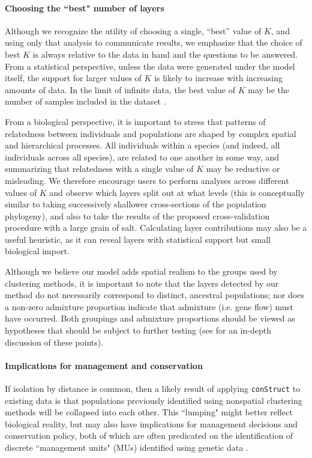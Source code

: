 \documentclass[10pt,letterpaper]{article}
\begin{document}
\paragraph{Choosing the ``best" number of layers}
Although we recognize the utility of choosing a single, ``best'' value of $K$, 
and using only that analysis to communicate results, 
we emphasize that 
the choice of best $K$ is always relative to the data in hand
and the questions to be answered.
From a statistical perspective, unless the data were generated under the model itself,
the support for larger values of $K$ is likely to increase with increasing amounts of data.
In the limit of infinite data, the best value of $K$ 
may be the number of samples included in the dataset \cite{Patterson2006}.

From a biological perspective, 
it is important to stress that patterns of relatedness between individuals and populations 
are shaped by complex spatial and hierarchical processes.
All individuals within a species (and indeed, all individuals across all species), 
are related to one another in some way, 
and summarizing that relatedness with a single value of $K$ may be reductive or misleading.
We therefore encourage users to perform analyses across different values of $K$ and 
observe which layers split out at what levels 
(this is conceptually similar to taking successively shallower
cross-sections of the population phylogeny), 
and also to take the results of the proposed cross-validation procedure with a large grain of salt.
Calculating layer contributions may also be a useful heuristic, 
as it can reveal layers with statistical support but small biological import.

Although we believe our model adds spatial realism to the groups used by clustering methods,
it is important to note that the layers detected by our method 
do not necessarily correspond  to distinct, ancestral populations; 
nor does a non-zero admixture proportion indicate that admixture 
(i.e. gene flow) must have occurred. 
Both groupings and admixture proportions
should be viewed as hypotheses that should be subject to further testing
(see \cite{Falush:16} for an in-depth discussion of these points).

\paragraph{Implications for management and conservation}
If isolation by distance is common, 
then a likely result of applying \texttt{conStruct} to existing data is that 
populations previously identified using nonspatial clustering methods 
will be collapsed into each other.  
This ``lumping" might better reflect biological reality, 
but may also have implications for management decisions and conservation policy, 
both of which are often predicated on the identification of discrete ``management units" (MUs) 
identified using genetic data \cite{Moritz1994,Waples_1998,Moritz_etal_2002}.
\end{document}
